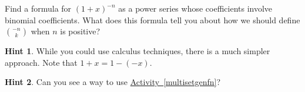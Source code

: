 \documentclass{book}
\begin{document}
\setcounter{cpjt}{253}
\addtocounter{cpjt}{-1}
\begin{activity}\label{negnchoosek}
\hypertarget{p-1316}{}%
Find a formula for \((1+x)^{-n}\) as a power series whose coefficients involve binomial coefficients. What does this formula tell you about how we should define \(\binom{-n}{k}\) when \(n\) is positive?%
\par\smallskip%
\noindent\textbf{Hint 1}.\hypertarget{hint-161}{}\quad%
\hypertarget{p-1317}{}%
While you could use calculus techniques, there is a much simpler approach. Note that \(1 + x = 1 - (-x)\).%
\par\smallskip%
\noindent\textbf{Hint 2}.\hypertarget{hint-162}{}\quad%
\hypertarget{p-1318}{}%
Can you see a way to use \hyperref[multisetgenfn]{Activity~\ref{multisetgenfn}}?%
\par\smallskip%
\noindent\end{activity}

\clearpage
\end{document}
